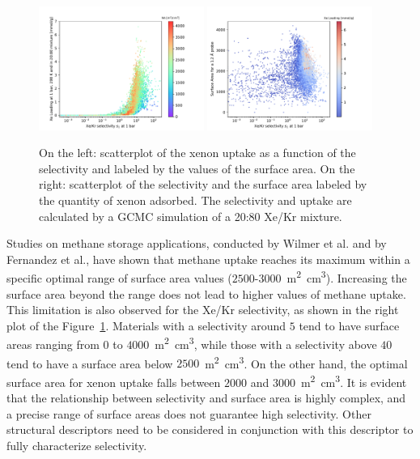 \documentclass[main.tex]{subfiles}
\begin{document}
\begin{figure}[ht!]
  \centering
  \includegraphics[width=0.48\textwidth]{figures/2-thermo/Scatterplot_uptake_selectivity_sa.pdf}
  \hfill
  \includegraphics[width=0.48\textwidth]{figures/2-thermo/Scatterplot_sa_selectivity.pdf}
  \caption{On the left: scatterplot of the xenon uptake as a function of the selectivity and labeled by the values of the surface area. On the right: scatterplot of the selectivity and the surface area labeled by the quantity of xenon adsorbed. The selectivity and uptake are calculated by a GCMC simulation of a 20:80 Xe/Kr mixture.}\label{fgr:sa}
\end{figure}

Studies on methane storage applications, conducted by Wilmer et al.\autocite{Wilmer_2012} and by Fernandez et al.\autocite{Fernandez_2013}, have shown that methane uptake reaches its maximum within a specific optimal range of surface area values ($2500$-$3000$~\si{\square\meter\cubic\centi\meter}). Increasing the surface area beyond the range does not lead to higher values of methane uptake. This limitation is also observed for the Xe/Kr  selectivity, as shown in the right plot of the Figure~\ref{fgr:sa}. Materials with a selectivity around $5$ tend to have surface areas ranging from $0$ to $4000$~\si{\square\meter\cubic\centi\meter}, while those with a selectivity above $40$ tend to have a surface area below $2500$~\si{\square\meter\cubic\centi\meter}. On the other hand, the optimal surface area for xenon uptake falls between $2000$ and $3000$~\si{\square\meter\cubic\centi\meter}. It is evident that the relationship between selectivity and surface area is highly complex, and a precise range of surface areas does not guarantee high selectivity. Other structural descriptors need to be considered in conjunction with this descriptor to fully characterize selectivity. 
\end{document}
